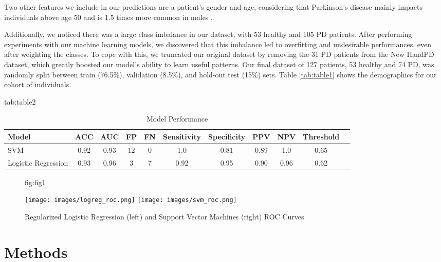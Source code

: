 \documentclass[pmlr,twocolumn,10pt,breaklinks, x11names,table]{jmlr} %
\begin{document}
Two other features we include in our predictions are a patient's gender and age, considering that Parkinson's disease mainly impacts individuals above age 50 and is 1.5 times more common in males \citep{reekes2020sex}. 

Additionally, we noticed there was a large class imbalance in our dataset, with 53 healthy and 105 PD patients. After performing experiments with our machine learning models, we discovered that this imbalance led to overfitting and undesirable performances, even after weighting the classes. To cope with this, we truncated our original dataset by removing the 31 PD patients from the New HandPD dataset, which greatly boosted our model's ability to learn useful patterns. Our final dataset of 127 patients, 53 healthy and 74 PD, was randomly split between train (76.5\%), validation (8.5\%), and hold-out test (15\%) sets. Table \ref{tab:table1} shows the demographics for our cohort of individuals. 

\begin{table*}[hbtp]
\centering 
\floatconts
{tab:table2}
{\caption{Model Performance}}
    {
        \begin{tabular}{lcccccccccc}
        \toprule
        \bfseries Model & \bfseries ACC & \bfseries AUC & \bfseries FP & \bfseries FN & \bfseries Sensitivity & \bfseries Specificity & \bfseries PPV & \bfseries NPV & \bfseries Threshold \\
        \midrule
        SVM & 0.92 & 0.93 & 12 & 0 & 1.0 & 0.81 & 0.89 & 1.0 & 0.65 \\
        Logistic Regression & 0.93 & 0.96 & 3 & 7 & 0.92 & 0.95 & 0.90 & 0.96 & 0.62 \\
        \bottomrule
        \end{tabular}
    }
\end{table*}

\begin{figure*}[hbtp]
\centering
\floatconts
{fig:fig1}
{\caption{Regularized Logistic Regression (left) and Support Vector Machines (right) ROC Curves}}

    {{\texttt{[image: images/logreg\_roc.png]} }}%
    {\texttt{[image: images/svm\_roc.png]}} %

\end{figure*}
\section{Methods}
\label{Methodology}
\end{document}
